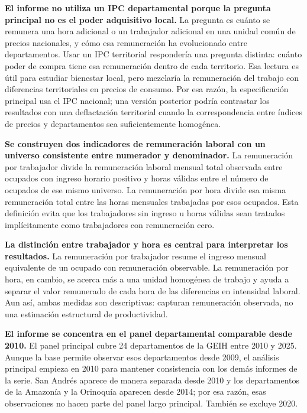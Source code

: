 \textbf{El informe no utiliza un IPC departamental porque la pregunta principal no es el poder adquisitivo local.} La pregunta es cuánto se remunera una hora adicional o un trabajador adicional en una unidad común de precios nacionales, y cómo esa remuneración ha evolucionado entre departamentos. Usar un IPC territorial respondería una pregunta distinta: cuánto poder de compra tiene esa remuneración dentro de cada territorio. Esa lectura es útil para estudiar bienestar local, pero mezclaría la remuneración del trabajo con diferencias territoriales en precios de consumo. Por esa razón, la especificación principal usa el IPC nacional; una versión posterior podría contrastar los resultados con una deflactación territorial cuando la correspondencia entre índices de precios y departamentos sea suficientemente homogénea.

\textbf{Se construyen dos indicadores de remuneración laboral con un universo consistente entre numerador y denominador.} La remuneración por trabajador divide la remuneración laboral mensual total observada entre ocupados con ingreso horario positivo y horas válidas entre el número de ocupados de ese mismo universo. La remuneración por hora divide esa misma remuneración total entre las horas mensuales trabajadas por esos ocupados. Esta definición evita que los trabajadores sin ingreso u horas válidas sean tratados implícitamente como trabajadores con remuneración cero.

\textbf{La distinción entre trabajador y hora es central para interpretar los resultados.} La remuneración por trabajador resume el ingreso mensual equivalente de un ocupado con remuneración observable. La remuneración por hora, en cambio, se acerca más a una unidad homogénea de trabajo y ayuda a separar el valor remunerado de cada hora de las diferencias en intensidad laboral. Aun así, ambas medidas son descriptivas: capturan remuneración observada, no una estimación estructural de productividad.

\textbf{El informe se concentra en el panel departamental comparable desde 2010.} El panel principal cubre 24 departamentos de la GEIH entre 2010 y 2025. Aunque la base permite observar esos departamentos desde 2009, el análisis principal empieza en 2010 para mantener consistencia con los demás informes de la serie. San Andrés aparece de manera separada desde 2010 y los departamentos de la Amazonía y la Orinoquía aparecen desde 2014; por esa razón, esas observaciones no hacen parte del panel largo principal. También se excluye 2020.

